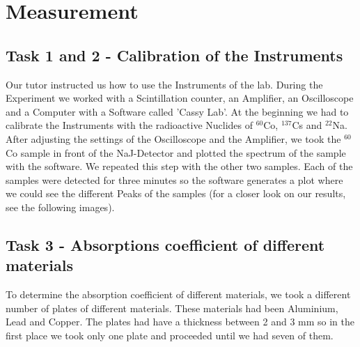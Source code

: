 \section{Measurement}

\subsection{Task 1 and 2 - Calibration of the Instruments}
Our tutor instructed us how to use the Instruments of the lab. During the Experiment we worked with a Scintillation counter, an Amplifier, an Oscilloscope and a Computer with a Software called 'Cassy Lab'. At the beginning we had to calibrate the Instruments with the radioactive Nuclides of $^{60}$Co, $^{137}$Cs and $^{22}$Na. After adjusting the settings of the Oscilloscope and the Amplifier, we took the $^{60}$Co sample in front of the NaJ-Detector and plotted the spectrum of the sample with the software. We repeated this step with the other two samples. Each of the samples were detected for three minutes so the software generates a plot where we could see the different Peaks of the samples (for a closer look on our results, see the following images).

\subsection{Task 3 - Absorptions coefficient of different materials}
To determine the absorption coefficient of different materials, we took a different number of plates of different materials. These materials had been Aluminium, Lead and Copper. The plates had have a thickness between 2 and 3 mm so in the first place we took only one plate and proceeded until we had seven of them. 

